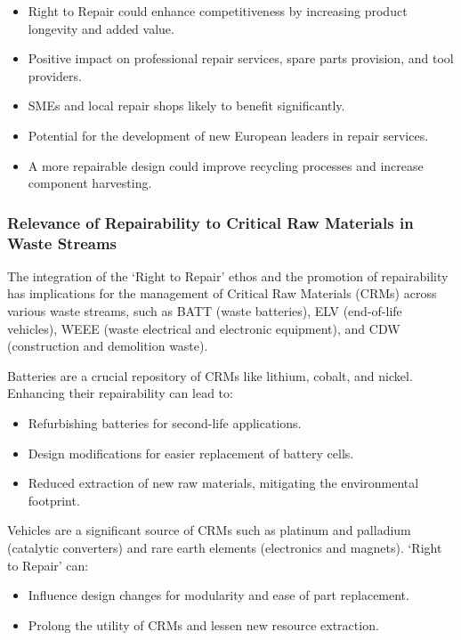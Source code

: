 \begin{itemize}
    \item Right to Repair could enhance competitiveness by increasing product longevity
          and added value.
    \item Positive impact on professional repair services, spare parts provision, and
          tool providers.
    \item SMEs and local repair shops likely to benefit significantly.
    \item Potential for the development of new European leaders in repair services.
    \item A more repairable design could improve recycling processes and increase
          component harvesting.
\end{itemize}

\subsubsection{Relevance of Repairability to Critical Raw Materials in Waste Streams}

The integration of the `Right to Repair' ethos and the promotion of
repairability has implications for the management of Critical Raw Materials
(CRMs) across various waste streams, such as BATT (waste batteries), ELV
(end-of-life vehicles), WEEE (waste electrical and electronic equipment), and
CDW (construction and demolition waste).

Batteries are a crucial repository of CRMs like lithium, cobalt, and nickel. Enhancing their repairability can lead to:
\begin{itemize}
    \item Refurbishing batteries for second-life applications.
    \item Design modifications for easier replacement of battery cells.
    \item Reduced extraction of new raw materials, mitigating the environmental
          footprint.
\end{itemize}

Vehicles are a significant source of CRMs such as platinum and palladium (catalytic converters) and rare earth elements (electronics and magnets). `Right to Repair' can:
\begin{itemize}
    \item Influence design changes for modularity and ease of part replacement.
    \item Prolong the utility of CRMs and lessen new resource extraction.
\end{itemize}

